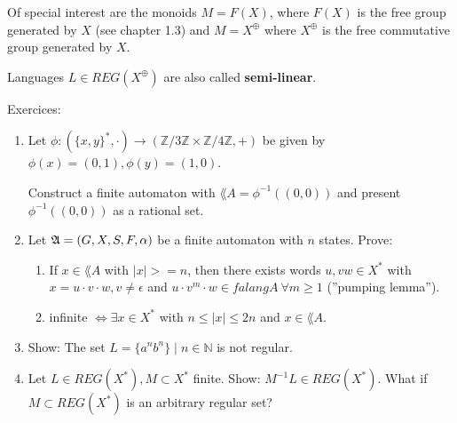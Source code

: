Of special interest are the monoids $M = F(X)$, where $F(X)$ is the free group
generated by $X$ (see chapter 1.3) and $M = X^\oplus$ where $X^\oplus$ is the
free commutative group generated by $X$.

Languages $L \in REG(X^\oplus)$ are also called {\bf semi-linear}.

Exercices:
\begin{enumerate}
  \item Let $\phi : (\{x, y\}^*, \cdot) \to (\mathbb{Z} / 3 \mathbb{Z} \times
  \mathbb{Z} / 4 \mathbb{Z}, +)$ be given by $\phi(x) = (0,1), \phi(y) = (1,0)$.
  
  Construct a finite automaton  with $\lang{A} = \phi^{-1}((0,0))$ and
  present $\phi^{-1}((0,0))$ as a rational set.
  
  \item Let $\mbox{$\mathfrak{A}$} = (G, X, S, F, \alpha)$ be a finite automaton with $n$
  states. Prove:
  \begin{enumerate}
    \item If $x \in \lang{A}$ with $|x| >= n$, then there exists words $u, v
    w \in X^*$ with $x = u \cdot v \cdot w, v \neq \epsilon$ and $u \cdot v^m
    \cdot w \in falang{A}\ \forall m \geq 1$ (''pumping lemma'').
    \item {} infinite $\Leftrightarrow \exists x \in X^*$ with $n \leq
    |x| \leq 2n$ and $x \in \lang{A}$.
   \end {enumerate}

	\item Show: The set $L = \{ a^n b^n \} \mid n \in \mathbb{N}$ is not regular.
	
	\item Let $L \in REG(X^*), M \subset X^*$ finite. Show: $M^{-1}L \in REG(X^*)$.
	What if $M \subset REG(X^*)$ is an arbitrary regular set?
\end{enumerate}

